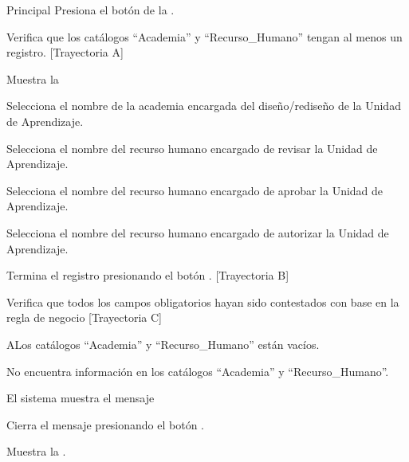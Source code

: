 \begin{UCtrayectoria}{Principal}
    \UCpaso[\UCactor] Presiona el botón  de la .
    
    \UCpaso Verifica que los catálogos ``Academia'' y ``Recurso\_Humano'' tengan al menos un registro. [Trayectoria A]
    
    \UCpaso Muestra la 
    
    \UCpaso[\UCactor] Selecciona el nombre de la academia encargada del diseño/rediseño de la Unidad de Aprendizaje. 
    
    \UCpaso[\UCactor] Selecciona el nombre del recurso humano encargado de revisar la Unidad de Aprendizaje.
    
    \UCpaso[\UCactor] Selecciona el nombre del recurso humano encargado de aprobar la Unidad de Aprendizaje.
    
    \UCpaso[\UCactor] Selecciona el nombre del recurso humano encargado de autorizar la Unidad de Aprendizaje.
    
    \UCpaso[\UCactor] Termina el registro presionando el botón . [Trayectoria B]
    
    \UCactor Verifica que todos los campos obligatorios hayan sido contestados con base en la regla de negocio  [Trayectoria C]
    
    \UCpaso[\UCactor]
\end{UCtrayectoria}


\begin{UCtrayectoriaA}{A}{Los catálogos ``Academia'' y ``Recurso\_Humano'' están vacíos.}

    \UCpaso No encuentra información en los catálogos ``Academia'' y ``Recurso\_Humano''.
    
    \UCpaso El sistema muestra el mensaje 
    
    \UCpaso[\UCactor] Cierra el mensaje presionando el botón .
    
    \UCpaso Muestra la .
\end{UCtrayectoriaA}

